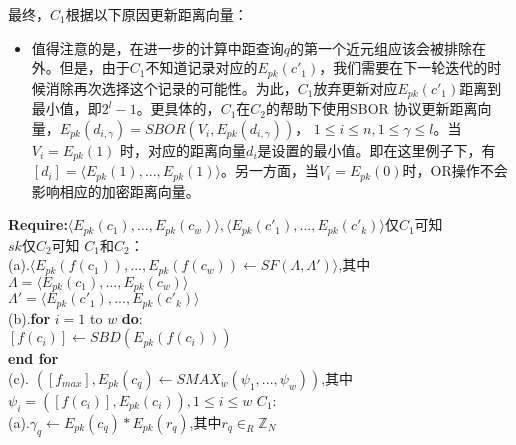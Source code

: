 最终，$C_1$根据以下原因更新距离向量：
\begin{itemize}
\item 值得注意的是，在进一步的计算中距查询$q$的第一个近元组应该会被排除在外。但是，由于$C_1$不知道记录对应的$E_{pk}(c'_1)$，我们需要在下一轮迭代的时候消除再次选择这个记录的可能性。为此，$C_1$放弃更新对应$E_{pk}(c'_1)$距离到最小值，即$2^l-1$。更具体的，$C_1$在$C_2$的帮助下使用SBOR 协议更新距离向量，$E_{pk}(d_{i,\gamma})=SBOR(V_i,E_{pk}(d_{i,\gamma}))$，
    $1 \leq i \leq n, 1 \leq \gamma \leq l$。当$V_i=E_{pk}(1)$ 时，对应的距离向量$d_i$是设置的最小值。即在这里例子下，有$[d_i]=\langle E_{pk}(1),...,E_{pk}(1)\rangle$。另一方面，当$V_i=E_{pk}(0)$时，OR操作不会影响相应的加密距离向量。

\end{itemize}
\begin{algorithm}[H]
\small
\caption{$SCMC_k(E_{pk}(c'_1),...,E_{pk}(c'_k))\rightarrow c_q$}
\label{alg:algorithm5}
\begin{algorithmic}[1]
    \State \textbf{Require:}$\langle E_{pk}(c_1),...,E_{pk}(c_w)\rangle,\langle E_{pk}(c'_1),...,E_{pk}(c'_k)\rangle$仅$C_1$可知\\
    \hspace{1.5cm} $sk$仅$C_2$可知
    \State $C_1$和$C_2$：\\
    (a).\hspace{0.1cm}$\langle E_{pk}(f(c_1)),...,E_{pk}(f(c_w)) \leftarrow SF(\Lambda,\Lambda')\rangle$,其中$\Lambda=\langle E_{pk}(c_1),...,E_{pk}(c_w)\rangle$\\
    \hspace{0.6cm}$\Lambda'=\langle E_{pk}(c'_1),...,E_{pk}(c'_k)\rangle$\\
    (b).\hspace{0.1cm}\textbf{for} $i=1$ to $w$  \textbf{do}:\\
    \hspace{1cm}$[f(c_i)] \leftarrow SBD(E_{pk}(f(c_i)))$\\
    \hspace{0.6cm} \textbf{end for}\\
    (c).\hspace{0.1cm} $([f_{max}],E_{pk}(c_q) \leftarrow SMAX_w(\psi_1,...,\psi_w))$,其中\\
    \hspace{0.6cm} $\psi_i=([f(c_i)],E_{pk}(c_i)),1 \leq i \leq w$
    \State $C_1$:\\
     (a).\hspace{0.2cm}$\gamma_q \leftarrow E_{pk}(c_q)*E_{pk}(r_q)$,其中$r_q \in_R \mathbb{Z}_N$\\

\end{algorithmic}
\end{algorithm}
